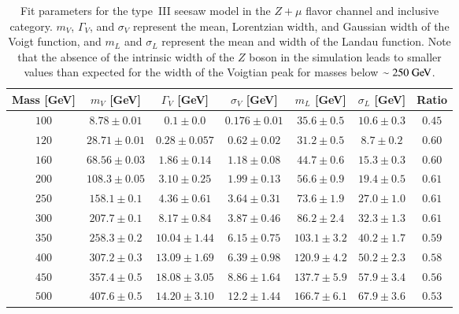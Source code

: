 \begin{table}[h]
 \centering
\scriptsize
\caption{Fit parameters for the type~III seesaw model in the $Z+\mu$ flavor channel and inclusive category. $m_V$, $\Gamma_V$, and $\sigma_V$ represent the mean, Lorentzian width, and Gaussian width of the Voigt function, and $m_L$ and $\sigma_L$ represent the mean and width of the Landau function. Note that the absence of the intrinsic width of the $Z$ boson in the simulation leads to smaller values than expected for the width of the Voigtian peak for masses below $\sim250 \GeV$.}
 \begin{tabular}{|c||c|c|c|c|c|c|}  
 \hline\hline
Mass [GeV] & $m_V$ [GeV] &  $\Gamma_V$ [GeV] &  $\sigma_V$ [GeV] & $m_L$  [GeV] & $\sigma_L$ [GeV] & Ratio\\
\hline \hline
$100$&$8.78\pm0.01 $&$ 0.1\pm0.0$&$ 0.176\pm0.01 $&$ 35.6\pm0.5 $&$ 10.6\pm0.3 $&$0.45 $\\ 
$120$&$28.71\pm0.01 $&$ 0.28\pm0.057 $&$ 0.62\pm0.02 $&$ 31.2\pm0.5 $&$ 8.7\pm0.2 $&$0.60 $\\ 
$160$&$68.56\pm0.03 $&$ 1.86\pm0.14$&$ 1.18\pm0.08 $&$ 44.7\pm0.6 $&$ 15.3\pm0.3 $&$0.60 $\\ 
$200$&$108.3\pm0.05 $&$ 3.10\pm0.25 $&$ 1.99\pm0.13 $&$ 56.6\pm0.9 $&$ 19.4\pm0.5 $&$0.61$\\ 
$250$&$158.1\pm0.1 $&$ 4.36\pm0.61 $&$ 3.64\pm0.31 $&$ 73.6\pm1.9 $&$ 27.0\pm1.0 $&$0.61 $\\ 
$300$&$207.7\pm0.1 $&$ 8.17\pm0.84 $&$ 3.87\pm0.46 $&$ 86.2\pm2.4 $&$ 32.3\pm1.3 $&$0.61$ \\ 
$350$&$258.3\pm0.2 $&$ 10.04\pm1.44 $&$ 6.15\pm0.75 $&$ 103.1\pm3.2 $&$ 40.2\pm1.7 $&$0.59 $\\ 
$400$&$307.2\pm0.3 $&$ 13.09\pm1.69 $&$ 6.39\pm0.98 $&$ 120.9\pm4.2 $&$ 50.2\pm2.3 $&$0.58$ \\ 
$450$&$357.4\pm0.5 $&$ 18.08\pm3.05 $&$ 8.86\pm1.64 $&$ 137.7\pm5.9 $&$ 57.9\pm3.4 $&$0.56$ \\ 
$500$&$407.6\pm0.5 $&$ 14.20\pm3.10 $&$ 12.2\pm1.44 $&$ 166.7\pm6.1 $&$ 67.9\pm3.6 $&$0.53 $\\ 
\hline\hline
\end{tabular} 
   \label{table:ZmuFitParamsSS}
\end{table}


